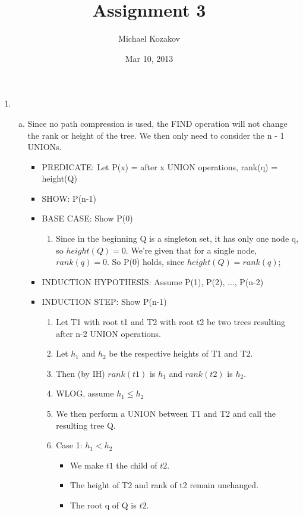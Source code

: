 \documentclass[11pt]{article}
\author{Michael Kozakov}
\title{Assignment 3}
\date{Mar 10, 2013}
\begin{document}
 	\maketitle
	\begin{enumerate}
		\item %
			\begin{enumerate}[a)]
				\item %
					Since no path compression is used, the FIND operation will not change the rank or height of the tree. We then only need to consider the n - 1 UNIONs.
					
					\begin{itemize} %
					
					\item PREDICATE: Let P(x) = after x UNION operations, rank(q) = height(Q)
					\item SHOW: P(n-1)
					\item BASE CASE: Show P(0)
						\begin{enumerate}[$\circ$]
							\item Since in the beginning Q is a singleton set, it has only one node q, so $height(Q) = 0$. We're given that for a single node, $rank(q) = 0$. So P(0) holds, since $height(Q) = rank(q)$;
						\end{enumerate}
					\item INDUCTION HYPOTHESIS: Assume P(1), P(2), ..., P(n-2)
					\item INDUCTION STEP: Show P(n-1)
						\begin{enumerate}[$\circ$]
							\item Let T1 with root t1 and T2 with root t2 be two trees resulting after n-2 UNION operations.
							\item Let $h_1$ and $h_2$ be the respective heights of T1 and T2.
							\item Then (by IH) $rank(t1)$ is $h_1$ and $rank(t2)$ is $h_2$.
							\item WLOG, assume $h_1 \le h_2$
							\item We then perform a UNION between T1 and T2 and call the resulting tree Q.
							\item Case 1: $h_1 < h_2$
								\begin{itemize}
									\item We make $t1$ the child of $t2$.
									\item The height of T2 and rank of t2 remain unchanged.
									\item The root q of Q is $t2$.

\end{itemize}
\end{enumerate}
\end{itemize}
\end{enumerate}
\end{enumerate}
\end{document}

